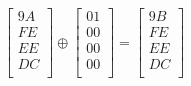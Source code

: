 \[
  \begin{bmatrix}
    9A \\
    FE \\
    EE \\
    DC \\
  \end{bmatrix}
  \oplus
  \begin{bmatrix}
    01 \\
    00 \\
    00 \\
    00 \\
  \end{bmatrix}
  =
  \begin{bmatrix}
    9B \\
    FE \\
    EE \\
    DC \\
  \end{bmatrix}
\]